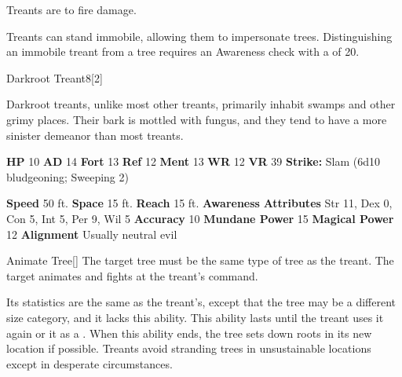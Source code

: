         Treants are  to fire damage.
      
        Treants can stand immobile, allowing them to impersonate trees.
        Distinguishing an immobile treant from a tree requires an Awareness check with a  of 20.
  

  \begin{monsubsection}{Darkroot Treant}{8}[2]
    \vspace{-1em}\vspace{-1em}
    \vspace{0em}

    
          Darkroot treants, unlike most other treants, primarily inhabit swamps and other grimy places.
          Their bark is mottled with fungus, and they tend to have a more sinister demeanor than most treants.
        

    \begin{spellcontent}
      \begin{spelltargetinginfo}
        \pari \textbf{HP} 10 \monsep
          \textbf{AD} 14 \monsep
          \textbf{Fort} 13 \monsep
          \textbf{Ref} 12 \monsep
          \textbf{Ment} 13
        \pari \textbf{WR} 12 \monsep
        \textbf{VR} 39
        \pari \textbf{Strike:}
            Slam  (6d10 bludgeoning; Sweeping 2)
      \end{spelltargetinginfo}
    \end{spellcontent}
    \begin{monsterfooter}
      \pari \textbf{Speed} 50 ft. \monsep
        \textbf{Space} 15 ft. \monsep
        \textbf{Reach} 15 ft.
      \pari \textbf{Awareness} 
      \pari \textbf{Attributes}
        Str 11, Dex 0,
        Con 5, Int 5,
        Per 9, Wil 5
      \pari \textbf{Accuracy} 10 \monsep
        \textbf{Mundane Power} 15 \monsep
      \textbf{Magical Power} 12
      \pari \textbf{Alignment} Usually neutral evil
    \end{monsterfooter}
  \end{monsubsection}
  \begin{freeability}{Animate Tree}[]
      The target tree must be the same type of tree as the treant.
        The target animates and fights at the treant's command.

        Its statistics are the same as the treant's, except that the tree may be a different size category, and it lacks this ability.
        This ability lasts until the treant uses it again or  it as a .
        When this ability ends, the tree sets down roots in its new location if possible.
        Treants avoid stranding trees in unsustainable locations except in desperate circumstances.
    \end{freeability}
  
